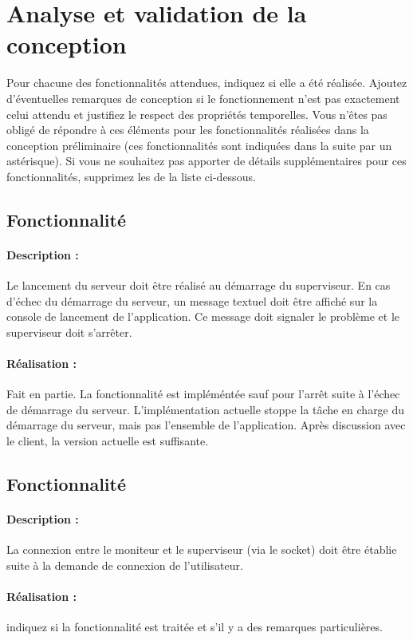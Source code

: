 \documentclass[11pt, a4paper]{paper}
\newcounter{cptreq}
\begin{document}
\section{Analyse et validation de la conception}

{\color{red}Pour chacune des fonctionnalités attendues, indiquez si elle a été réalisée. Ajoutez d'éventuelles remarques de conception si le fonctionnement n'est pas exactement celui attendu et justifiez le respect des propriétés temporelles. Vous n'êtes pas obligé de répondre à ces éléments pour les fonctionnalités réalisées dans la conception préliminaire (ces fonctionnalités sont indiquées dans la suite par un astérisque). Si vous ne souhaitez pas apporter de détails supplémentaires pour ces fonctionnalités, supprimez les de la liste ci-dessous.}

{\color{gray}
\subsection{Fonctionnalité \thecptreq *}

\paragraph{Description :} Le lancement du serveur doit être réalisé au démarrage du superviseur. En cas d'échec du démarrage du serveur, un message textuel doit être  affiché sur la console de lancement de l'application. Ce message doit signaler le problème et le superviseur doit s'arrêter.

\paragraph{\color{black}Réalisation :}  {\color{blue} Fait en partie. La fonctionnalité est impléméntée sauf pour l'arrêt suite à l'échec de démarrage du serveur. L'implémentation actuelle stoppe la tâche en charge du démarrage du serveur, mais pas l'ensemble de l'application. Après discussion avec le client, la version actuelle est suffisante.}
}
{\color{gray}
\subsection{Fonctionnalité \thecptreq *}

\paragraph{Description :} La connexion entre le moniteur et le superviseur (via le socket) doit être établie suite à la demande de connexion de l'utilisateur.

\paragraph{\color{black}Réalisation :}  {\color{red} indiquez si la fonctionnalité est traitée et s'il y a des remarques particulières.}
}
\end{document}
